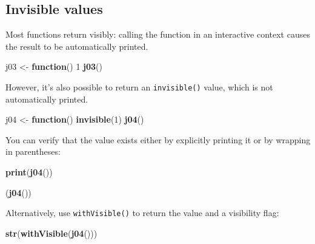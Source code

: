 \documentclass[]{book}
\newenvironment{Shaded}{\begin{snugshade}}{\end{snugshade}}
\newcommand{\ControlFlowTok}[1]{\textcolor[rgb]{0.13,0.29,0.53}{\textbf{#1}}}
\newcommand{\DecValTok}[1]{\textcolor[rgb]{0.00,0.00,0.81}{#1}}
\newcommand{\KeywordTok}[1]{\textcolor[rgb]{0.13,0.29,0.53}{\textbf{#1}}}
\newcommand{\NormalTok}[1]{#1}
\newcommand{\StringTok}[1]{\textcolor[rgb]{0.31,0.60,0.02}{#1}}
\theoremstyle{definition}
\theoremstyle{definition}
\theoremstyle{definition}
\theoremstyle{remark}
\begin{document}
\hypertarget{invisible-values}{%
\subsection{Invisible values}\label{invisible-values}}

Most functions return visibly: calling the function in an interactive
context causes the result to be automatically printed.

\begin{Shaded}
\begin{Highlighting}[]
\NormalTok{j03 <-}\StringTok{ }\ControlFlowTok{function}\NormalTok{() }\DecValTok{1}
\KeywordTok{j03}\NormalTok{()}
\end{Highlighting}
\end{Shaded}

However, it's also possible to return an \texttt{invisible()} value,
which is not automatically printed.

\begin{Shaded}
\begin{Highlighting}[]
\NormalTok{j04 <-}\StringTok{ }\ControlFlowTok{function}\NormalTok{() }\KeywordTok{invisible}\NormalTok{(}\DecValTok{1}\NormalTok{)}
\KeywordTok{j04}\NormalTok{()}
\end{Highlighting}
\end{Shaded}

You can verify that the value exists either by explicitly printing it or
by wrapping in parentheses:

\begin{Shaded}
\begin{Highlighting}[]
\KeywordTok{print}\NormalTok{(}\KeywordTok{j04}\NormalTok{())}
\end{Highlighting}
\end{Shaded}

\begin{Shaded}
\begin{Highlighting}[]
\NormalTok{(}\KeywordTok{j04}\NormalTok{())}
\end{Highlighting}
\end{Shaded}

Alternatively, use \texttt{withVisible()} to return the value and a
visibility flag:

\begin{Shaded}
\begin{Highlighting}[]
\KeywordTok{str}\NormalTok{(}\KeywordTok{withVisible}\NormalTok{(}\KeywordTok{j04}\NormalTok{()))}
\end{Highlighting}
\end{Shaded}
\end{document}
